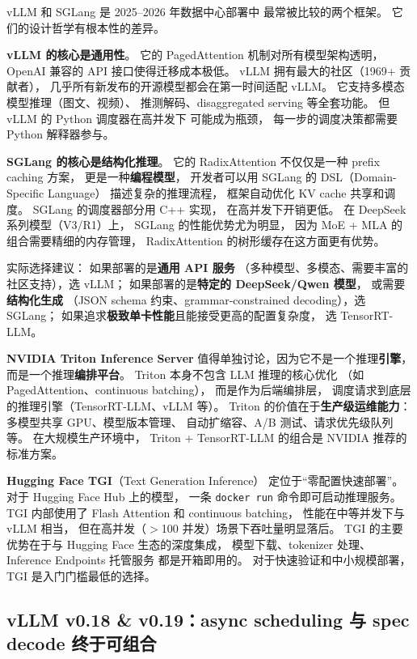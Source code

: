 \begin{whybox}
vLLM 和 SGLang 是 2025--2026 年数据中心部署中
最常被比较的两个框架。
它们的设计哲学有根本性的差异。

\textbf{vLLM 的核心是通用性}。
它的 PagedAttention 机制对所有模型架构透明，
OpenAI 兼容的 API 接口使得迁移成本极低。
vLLM 拥有最大的社区（1969+ 贡献者），
几乎所有新发布的开源模型都会在第一时间适配 vLLM。
它支持多模态模型推理（图文、视频）、
推测解码、disaggregated serving 等全套功能。
但 vLLM 的 Python 调度器在高并发下
可能成为瓶颈，
每一步的调度决策都需要 Python 解释器参与。

\textbf{SGLang 的核心是结构化推理}。
它的 RadixAttention 不仅仅是一种 prefix caching 方案，
更是一种\textbf{编程模型}，
开发者可以用 SGLang 的 DSL（Domain-Specific Language）
描述复杂的推理流程，
框架自动优化 KV cache 共享和调度。
SGLang 的调度器部分用 C++ 实现，
在高并发下开销更低。
在 DeepSeek 系列模型（V3/R1）上，
SGLang 的性能优势尤为明显，
因为 MoE + MLA 的组合需要精细的内存管理，
RadixAttention 的树形缓存在这方面更有优势。

实际选择建议：
如果部署的是\textbf{通用 API 服务}
（多种模型、多模态、需要丰富的社区支持），选 vLLM；
如果部署的是\textbf{特定的 DeepSeek/Qwen 模型}，
或需要\textbf{结构化生成}
（JSON schema 约束、grammar-constrained decoding），选 SGLang；
如果追求\textbf{极致单卡性能}且能接受更高的配置复杂度，
选 TensorRT-LLM。
\end{whybox}

\textbf{NVIDIA Triton Inference Server}
值得单独讨论，因为它不是一个推理\textbf{引擎}，
而是一个推理\textbf{编排平台}。
Triton 本身不包含 LLM 推理的核心优化
（如 PagedAttention、continuous batching），
而是作为后端编排层，
调度请求到底层的推理引擎（TensorRT-LLM、vLLM 等）。
Triton 的价值在于\textbf{生产级运维能力}：
多模型共享 GPU、模型版本管理、
自动扩缩容、A/B 测试、请求优先级队列等。
在大规模生产环境中，
Triton + TensorRT-LLM 的组合是 NVIDIA 推荐的标准方案。

\textbf{Hugging Face TGI}（Text Generation Inference）
定位于“零配置快速部署”。
对于 Hugging Face Hub 上的模型，
一条 \texttt{docker run} 命令即可启动推理服务。
TGI 内部使用了 Flash Attention 和 continuous batching，
性能在中等并发下与 vLLM 相当，
但在高并发（$>$100 并发）场景下吞吐量明显落后。
TGI 的主要优势在于与 Hugging Face 生态的深度集成，
模型下载、tokenizer 处理、Inference Endpoints 托管服务
都是开箱即用的。
对于快速验证和中小规模部署，TGI 是入门门槛最低的选择。

\subsection{vLLM v0.18 \& v0.19：async scheduling 与 spec decode 终于可组合}
\label{sec:vllm-018-019}

